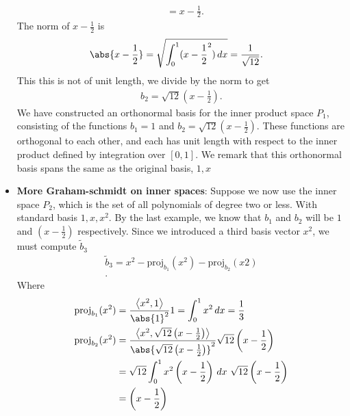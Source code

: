 \documentclass{report}
\begin{document}
\begin{itemize}
\begin{align*}
                              &= x-\frac{1}{2}
            .\end{align*}
            The norm of $x-\frac{1}{2}$ is 
            \begin{align*}
                \abs{x-\frac{1}{2}} &= \sqrt{\int_{0}^{1} (x-\frac{1}{2}^{2}) \, dx} = \frac{1}{\sqrt{12}}
            .\end{align*}
            This this is not of unit length, we divide by the norm to get
            \begin{align*}
                b_{2} = \sqrt{12}(x-\frac{1}{2})
            .\end{align*}
            \bigbreak \noindent 
            We have constructed an orthonormal basis for the inner product space \( P_1 \), consisting of the functions \( b_1 = 1 \) and \( b_2 = \sqrt{12} \left(x - \frac{1}{2}\right) \). These functions are orthogonal to each other, and each has unit length with respect to the inner product defined by integration over \([0,1]\).
            \bigbreak \noindent 
            We remark that this orthonormal basis spans the same as the original basis, $1,x$
        \item \textbf{More Graham-schmidt on inner spaces}: Suppose we now use the inner space $P_{2}$, which is the set of all polynomials of degree two or less. With standard basis $1,x,x^{2}$. By the last example, we know that $b_{1}$ and $b_{2}$ will be $1$ and $\left(x-\frac{1}{2}\right)$ respectively. Since we introduced a third basis vector $x^{2}$, we must compute $\tilde{b}_{3} $
            \begin{align*}
                \tilde{b}_{3} = x^{2} - \text{proj}_{b_{1}}(x^{2}) - \text{proj}_{b_{2}}(x2) \\
            .\end{align*}
            Where 
            \begin{align*}
                \text{proj}_{b_{1}}(x^{2}) &= \frac{\left\langle x^{2},1 \right\rangle}{\abs{1}^{2}}1 = \int_{0}^{1} x^{2} \, dx = \frac{1}{3} \\
                \text{proj}_{b_{2}}(x^{2}) &= \frac{\left\langle x^{2},\sqrt{12}\left(x-\frac{1}{2}\right) \right\rangle}{\abs{\sqrt{12}\left(x-\frac{1}{2}\right)}^{2}}\sqrt{12}\left(x-\frac{1}{2}\right)  \\
                                           &= \sqrt{12}\int_{0}^{1}  x^{2}\left(x-\frac{1}{2}\right)\, dx \ \sqrt{12}\left(x-\frac{1}{2}\right) \\
                                           &= \left(x-\frac{1}{2}\right)

\end{align*}
\end{itemize}
\end{document}
